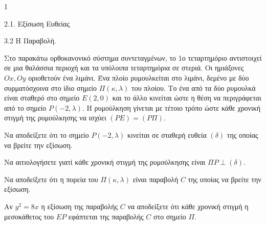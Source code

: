 \begin{ylh}{1}
    \item 2.1. Εξίσωση Ευθείας
    \item 3.2 Η Παραβολή.
\end{ylh}
\begin{figure}
\centering
{}
\end{figure}

Στο παρακάτω ορθοκανονικό σύστημα συντεταγμένων, το 1ο τεταρτημόριο αντιστοιχεί σε μια θαλάσσια περιοχή και τα υπόλοιπα τεταρτημόρια σε στεριά. Οι ημιάξονες $Ox, Oy$ οριοθετούν ένα λιμάνι.
Ένα πλοίο ρυμουλκείται στο λιμάνι, δεμένο με δύο συρματόσχοινα στο ίδιο σημείο $\Pi(\kappa,\lambda)$ του πλοίου. Το ένα από τα δύο ρυμουλκά είναι σταθερό στο σημείο $E(2,0)$ και το άλλο κινείται ώστε η θέση να περιγράφεται από το σημείο $P(-2,\lambda)$. Η ρυμούλκηση γίνεται με τέτοιο τρόπο ώστε κάθε χρονική στιγμή της ρυμούλκησης να ισχύει $(PE) = (P\Pi)$.

\begin{alist}
\item Να αποδείξετε ότι το σημείο $P(-2,\lambda)$ κινείται σε σταθερή ευθεία $(\delta)$ της οποίας να βρείτε την εξίσωση. 
\item Να αιτιολογήσετε γιατί κάθε χρονική στιγμή της ρυμούλκησης είναι $\Pi P \perp (\delta)$. 
\item Να αποδείξετε ότι η πορεία του $\Pi(\kappa,\lambda)$ είναι παραβολή $C$ της οποίας να βρείτε την εξίσωση. 
\item Αν $y^2 = 8x$ η εξίσωση της παραβολής $C$ να αποδείξετε ότι κάθε χρονική στιγμή η μεσοκάθετος του $EP$ εφάπτεται της παραβολής $C$ στο σημείο $\Pi$. 
\end{alist}